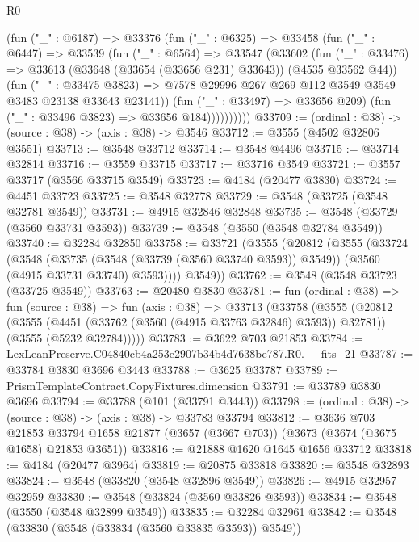 \begin{lexlean}{R0}
\begin{coremodule}
              (fun ("_" : @6187) =>
              @33376
                (fun ("_" : @6325) =>
                @33458
                  (fun ("_" : @6447) =>
                  @33539
                    (fun ("_" : @6564) =>
                    @33547
                      (@33602
                        (fun ("_" : @33476) =>
                        @33613 (@33648 (@33654 (@33656 @231) @33643)) (@4535 @33562 @44))
                        (fun ("_" : @33475 @3823) =>
                        @7578 @29996 @267 @269 @112 @3549 @3549 @3483 @23138 @33643 @23141))
                      (fun ("_" : @33497) => @33656 @209)
                      (fun ("_" : @33496 @3823) => @33656 @184))))))))))
@33709 := (ordinal : @38) -> (source : @38) -> (axis : @38) -> @3546
@33712 := @3555 (@4502 @32806 @3551)
@33713 := @3548 @33712
@33714 := @3548 @4496
@33715 := @33714 @32814
@33716 := @3559 @33715
@33717 := @33716 @3549
@33721 := @3557 @33717 (@3566 @33715 @3549)
@33723 := @4184 (@20477 @3830)
@33724 := @4451 @33723
@33725 := @3548 @32778
@33729 := @3548 (@33725 (@3548 @32781 @3549))
@33731 := @4915 @32846 @32848
@33735 := @3548 (@33729 (@3560 @33731 @3593))
@33739 := @3548 (@3550 (@3548 @32784 @3549))
@33740 := @32284 @32850
@33758 := @33721
    (@3555
      (@20812
        (@3555
          (@33724
            (@3548
              (@33735 (@3548 (@33739 (@3560 @33740 @3593)) @3549))
              (@3560 (@4915 @33731 @33740) @3593))))
        @3549))
@33762 := @3548 (@3548 @33723 (@33725 @3549))
@33763 := @20480 @3830
@33781 := fun (ordinal : @38) =>
  fun (source : @38) =>
  fun (axis : @38) =>
  @33713
    (@33758
      (@3555
        (@20812
          (@3555 (@4451 (@33762 (@3560 (@4915 @33763 @32846) @3593)) @32781))
          (@3555 (@5232 @32784)))))
@33783 := @3622 @703 @21853
@33784 := LexLeanPreserve.C04840cb4a253e2907b34b4d7638be787.R0.__fits_21
@33787 := @33784 @3830 @3696 @3443
@33788 := @3625 @33787
@33789 := PrismTemplateContract.CopyFixtures.dimension
@33791 := @33789 @3830 @3696
@33794 := @33788 (@101 (@33791 @3443))
@33798 := (ordinal : @38) -> (source : @38) -> (axis : @38) -> @33783 @33794
@33812 := @3636
    @703
    @21853
    @33794
    @1658
    @21877
    (@3657 (@3667 @703))
    (@3673 (@3674 (@3675 @1658) @21853 @3651))
@33816 := @21888 @1620 @1645 @1656 @33712
@33818 := @4184 (@20477 @3964)
@33819 := @20875 @33818
@33820 := @3548 @32893
@33824 := @3548 (@33820 (@3548 @32896 @3549))
@33826 := @4915 @32957 @32959
@33830 := @3548 (@33824 (@3560 @33826 @3593))
@33834 := @3548 (@3550 (@3548 @32899 @3549))
@33835 := @32284 @32961
@33842 := @3548 (@33830 (@3548 (@33834 (@3560 @33835 @3593)) @3549))

\end{coremodule}
\end{lexlean}
